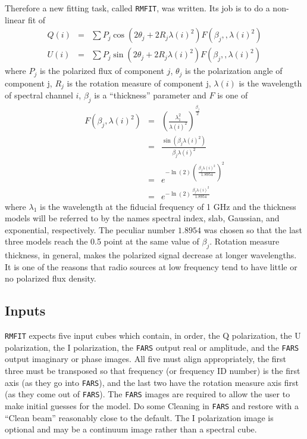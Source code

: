 \documentclass[twoside]{article}
\begin{document}
Therefore a new fitting task, called {\tt RMFIT}, was written.  Its
job is to do a non-linear fit of
\begin{eqnarray}
  Q(i) & = & \sum  P_j \cos (2\theta_j + 2 R_j \lambda(i)^2)
              F(\beta_j,, \lambda(i)^2) \\
  U(i) & = & \sum  P_j \sin (2\theta_j + 2 R_j \lambda(i)^2)
              F(\beta_j,, \lambda(i)^2)
\end{eqnarray}
where $P_j$ is the polarized flux of component $j$, $\theta_j$ is the
polarization angle of component j, $R_j$ is the rotation measure of
component j, $\lambda(i)$ is the wavelength of spectral channel $i$,
$\beta_j$ is a ``thickness'' parameter and $F$ is one of
\begin{eqnarray*}
F(\beta_j,\lambda(i)^2) & = & \left(
    \frac{\lambda_1^2}{\lambda(i)^2}\right) ^ {\frac{\beta_j}{2}} \\
  & = & \frac{\sin (\beta_j \lambda(i)^2)}{\beta_j \lambda(i)^2} \\
  & = & e ^ {-\ln(2)\, \left(\,\frac{\beta_j \lambda(i)^2}{1.8954}\,\right)^2} \\
  & = & e ^ {-\ln(2)\, \frac{\beta_j \lambda(i)^2}{1.8954}}
\end{eqnarray*}
where $\lambda_1$ is the wavelength at the fiducial frequency of 1 GHz
and the thickness models will be referred to by the names spectral
index, slab, Gaussian, and exponential, respectively.  The peculiar
number $1.8954$ was chosen so that the last three models reach the 0.5
point at the same value of $\beta_j$.  Rotation measure thickness, in
general, makes the polarized signal decrease at longer wavelengths.
It is one of the reasons that radio sources at low frequency tend to
have little or no polarized flux density.

\subsection{Inputs}

{\tt RMFIT} expects five input cubes which contain, in order, the Q
polarization, the U polarization, the I polarization, the {\tt FARS}
output real or amplitude, and the {\tt FARS} output imaginary or phase
images.  All five must align appropriately, the first three must be
transposed so that frequency (or frequency ID number) is the first
axis (as they go into {\tt FARS}), and the last two have the rotation
measure axis first (as they come out of {\tt FARS})\@.  The {\tt FARS}
images are required to allow the user to make initial guesses for the
model.  Do some Cleaning in {\tt FARS} and restore with a ``Clean
beam'' reasonably close to the default.  The I polarization image is
optional and may be a continuum image rather than a spectral cube.
\end{document}
